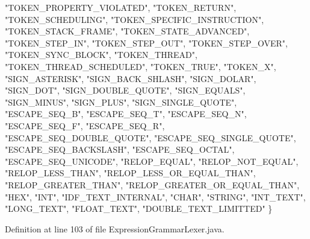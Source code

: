 \begin{DoxyCode}
    \textcolor{stringliteral}{"TOKEN\_PROPERTY\_VIOLATED"}, \textcolor{stringliteral}{"TOKEN\_RETURN"}, \textcolor{stringliteral}{"TOKEN\_SCHEDULING"}, \textcolor{stringliteral}{"TOKEN\_SPECIFIC\_INSTRUCTION"}, 
    \textcolor{stringliteral}{"TOKEN\_STACK\_FRAME"}, \textcolor{stringliteral}{"TOKEN\_STATE\_ADVANCED"}, \textcolor{stringliteral}{"TOKEN\_STEP\_IN"}, \textcolor{stringliteral}{"TOKEN\_STEP\_OUT"}, 
    \textcolor{stringliteral}{"TOKEN\_STEP\_OVER"}, \textcolor{stringliteral}{"TOKEN\_SYNC\_BLOCK"}, \textcolor{stringliteral}{"TOKEN\_THREAD"}, \textcolor{stringliteral}{"TOKEN\_THREAD\_SCHEDULED"}, 
    \textcolor{stringliteral}{"TOKEN\_TRUE"}, \textcolor{stringliteral}{"TOKEN\_X"}, \textcolor{stringliteral}{"SIGN\_ASTERISK"}, \textcolor{stringliteral}{"SIGN\_BACK\_SHLASH"}, \textcolor{stringliteral}{"SIGN\_DOLAR"}, 
    \textcolor{stringliteral}{"SIGN\_DOT"}, \textcolor{stringliteral}{"SIGN\_DOUBLE\_QUOTE"}, \textcolor{stringliteral}{"SIGN\_EQUALS"}, \textcolor{stringliteral}{"SIGN\_MINUS"}, \textcolor{stringliteral}{"SIGN\_PLUS"}, 
    \textcolor{stringliteral}{"SIGN\_SINGLE\_QUOTE"}, \textcolor{stringliteral}{"ESCAPE\_SEQ\_B"}, \textcolor{stringliteral}{"ESCAPE\_SEQ\_T"}, \textcolor{stringliteral}{"ESCAPE\_SEQ\_N"}, \textcolor{stringliteral}{"ESCAPE\_SEQ\_F"}, 
    \textcolor{stringliteral}{"ESCAPE\_SEQ\_R"}, \textcolor{stringliteral}{"ESCAPE\_SEQ\_DOUBLE\_QUOTE"}, \textcolor{stringliteral}{"ESCAPE\_SEQ\_SINGLE\_QUOTE"}, 
    \textcolor{stringliteral}{"ESCAPE\_SEQ\_BACKSLASH"}, \textcolor{stringliteral}{"ESCAPE\_SEQ\_OCTAL"}, \textcolor{stringliteral}{"ESCAPE\_SEQ\_UNICODE"}, \textcolor{stringliteral}{"RELOP\_EQUAL"}, 
    \textcolor{stringliteral}{"RELOP\_NOT\_EQUAL"}, \textcolor{stringliteral}{"RELOP\_LESS\_THAN"}, \textcolor{stringliteral}{"RELOP\_LESS\_OR\_EQUAL\_THAN"}, \textcolor{stringliteral}{"RELOP\_GREATER\_THAN"}, 
    \textcolor{stringliteral}{"RELOP\_GREATER\_OR\_EQUAL\_THAN"}, \textcolor{stringliteral}{"HEX"}, \textcolor{stringliteral}{"INT"}, \textcolor{stringliteral}{"IDF\_TEXT\_INTERNAL"}, \textcolor{stringliteral}{"CHAR"}, 
    \textcolor{stringliteral}{"STRING"}, \textcolor{stringliteral}{"INT\_TEXT"}, \textcolor{stringliteral}{"LONG\_TEXT"}, \textcolor{stringliteral}{"FLOAT\_TEXT"}, \textcolor{stringliteral}{"DOUBLE\_TEXT\_LIMITTED"}
  \}
\end{DoxyCode}


Definition at line 103 of file Expression\+Grammar\+Lexer.\+java.


